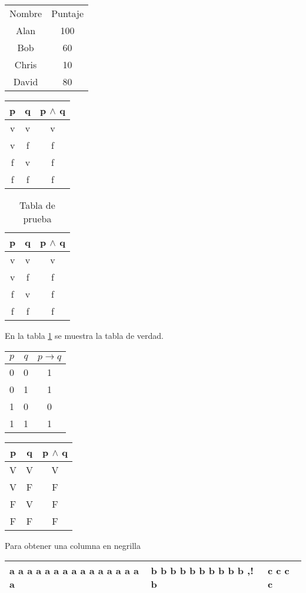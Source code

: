 \documentclass{article}
\begin{document}
\begin{table}
\centering
\begin{tabular}{cc}
Nombre & Puntaje \\
Alan & 100 \\
Bob & 60 \\
Chris & 10 \\
David & 80
\end{tabular}
\caption{}
\end{table}

\begin{tabular}{|cc|c|}
\hline
p & q & p $\wedge$ q\\
\hline
v & v & v\\
v & f & f\\
f & v & f\\
f & f & f\\
\hline
\end{tabular}

\begin{table}[H]
\centering
\begin{tabular}{|cc|c|}
\hline
p & q & p $\wedge$ q\\
\hline
v & v & v\\
v & f & f\\
f & v & f\\
f & f & f\\
\hline
\end{tabular}
\caption{Tabla de prueba}
\label{tab:tablaVerdad}
\end{table}
En la tabla \ref{tab:tablaVerdad} se muestra la tabla de verdad.

\begin{tabular}{|c|c|c|}
\hline
$p$ & $q$ & $p \rightarrow q$ \\ \hline
0 & 0 & 1 \\
0 & 1 & 1 \\ \cline{1-2}
1 & 0 & 0 \\
1 & 1 & 1 \\ \hline
\end{tabular}

\begin{tabular*}{5cm}{|cc|c|}
\hline
p & q & p $\wedge$ q\\
\hline
V & V & V\\
V & F & F\\
F & V & F\\
F & F & F\\
\hline
\end{tabular*}

Para obtener una columna en negrilla

\begin{tabular}{|p{1cm}|p{1cm}|p{1cm}|}
\hline
a a a a a a a a a a a a a a a a & b b b b b b b b b b
,! b & c c c c \\
\hline
\end{tabular}
\end{document}
